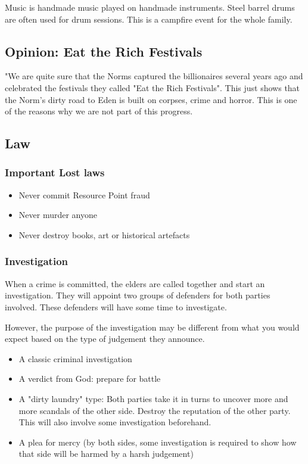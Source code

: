 Music is handmade music played on handmade instruments. Steel barrel drums are often used for drum sessions. This is a campfire event for the whole family.

\subsection{Opinion: Eat the Rich Festivals}

"We are quite sure that the Norms captured the billionaires several years ago and celebrated the festivals they called "Eat the Rich Festivals". This just shows that the Norm's dirty road to Eden is built on corpses, crime and horror. This is one of the reasons why we are not part of this progress.

\subsection{Law}
\label{sec:Lost law}

\subsubsection{Important Lost laws}

\begin{itemize}
\item{Never commit Resource Point fraud}
\item{Never murder anyone}
\item{Never destroy books, art or historical artefacts}
\end{itemize}

\subsubsection{Investigation}

When a crime is committed, the elders are called together and start an investigation. They will appoint two groups of defenders for both parties involved. These defenders will have some time to investigate.

However, the purpose of the investigation may be different from what you would expect based on the type of judgement they announce.

\begin{itemize}
    \item A classic criminal investigation
    \item A verdict from God: prepare for battle
    \item A "dirty laundry" type: Both parties take it in turns to uncover more and more scandals of the other side. Destroy the reputation of the other party. This will also involve some investigation beforehand.
    \item A plea for mercy (by both sides, some investigation is required to show how that side will be harmed by a harsh judgement)
\end{itemize}

